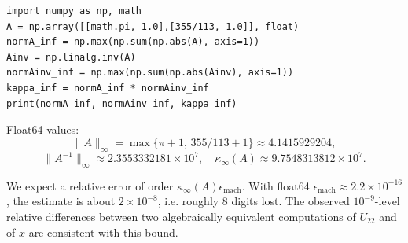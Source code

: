 \documentclass[11pt]{article}
\begin{document}
\begin{verbatim}
import numpy as np, math
A = np.array([[math.pi, 1.0],[355/113, 1.0]], float)
normA_inf = np.max(np.sum(np.abs(A), axis=1))
Ainv = np.linalg.inv(A)
normAinv_inf = np.max(np.sum(np.abs(Ainv), axis=1))
kappa_inf = normA_inf * normAinv_inf
print(normA_inf, normAinv_inf, kappa_inf)
\end{verbatim}

Float64 values:
\[
\|A\|_\infty=\max\{\pi+1,\,355/113+1\}\approx4.1415929204,
\]
\[
\|A^{-1}\|_\infty\approx2.3553332181\times10^{7},
\quad
\kappa_\infty(A)\approx9.7548313812\times10^{7}.
\]

We expect a relative error of order \(\kappa_\infty(A)\epsilon_{\text{mach}}\). With float64 \(\epsilon_{\text{mach}}\approx2.2\times10^{-16}\), the estimate is about \(2\times10^{-8}\), i.e. roughly 8 digits lost. The observed \(10^{-9}\)-level relative differences between two algebraically equivalent computations of \(U_{22}\) and of \(x\) are consistent with this bound.
\end{document}
